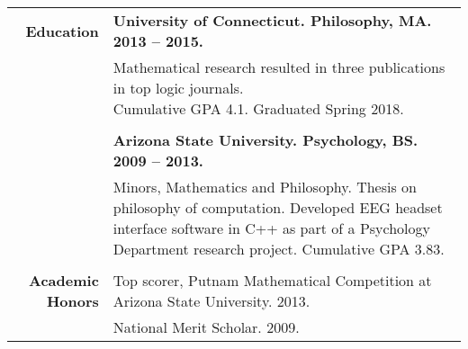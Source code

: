 \documentclass{article}
\begin{document}
\begin{tabular}{rl}
  {\bf Education} & {\bf University of Connecticut. Philosophy, MA. 2013 -- 2015.} \\
  & \parbox{4.5in}{Mathematical research resulted in three publications in top logic journals. \\ Cumulative GPA 4.1. Graduated Spring 2018.} \\ \\

  & {\bf Arizona State University. Psychology, BS. 2009 -- 2013.} \\
  & \parbox{4.5in}{Minors, Mathematics and Philosophy. Thesis on philosophy of computation. Developed EEG headset interface software in C++ as part of a Psychology Department research project. Cumulative GPA 3.83.} \\ \\



  {\bf Academic Honors} & Top scorer, Putnam Mathematical Competition at Arizona State University. 2013. \\
   & National Merit Scholar. 2009.
\end{tabular}
\egroup
\end{document}
